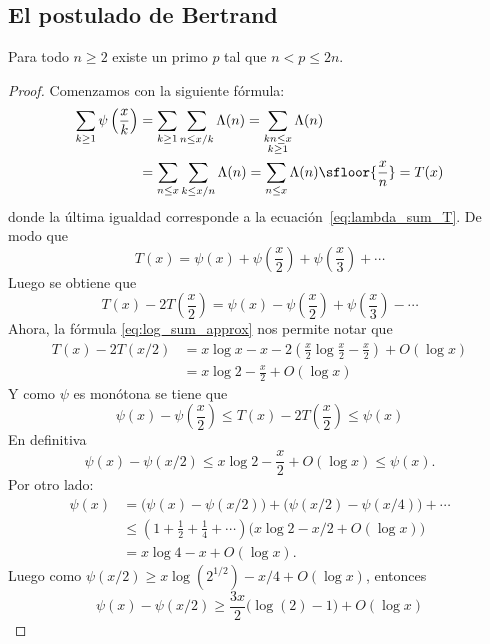 \documentclass[teoria-numeros.tex]{subfiles}
\begin{document}

\newpage
\subsection{El postulado de Bertrand}
\begin{thmi}
	Para todo $n \ge 2$ existe un primo $p$ tal que $n < p \le 2n$.
\end{thmi}
\begin{proof}
	Comenzamos con la siguiente fórmula:
	\begin{align*}
		\sum_{k\ge 1} \psi\left( \frac{x}{k} \right) &= \sum_{k\ge 1} \sum_{n \le x/k} \Lambda(n) = \sum_{\substack{ kn\le x \\ k\ge 1 }} \Lambda(n) \\
		&= \sum_{n\le x} \sum_{k\le x/n} \Lambda(n) = \sum_{n\le x} \Lambda(n) \sfloor{ \frac{x}{n} } = T(x)
	\end{align*}
	donde la última igualdad corresponde a la ecuación~\eqref{eq:lambda_sum_T}.
	De modo que
	$$ T(x) = \psi(x) + \psi\left( \frac{x}{2} \right) + \psi\left( \frac{x}{3} \right) + \cdots $$
	Luego se obtiene que
	$$ T(x) - 2T\left( \frac{x}{2} \right) = \psi(x) - \psi\left( \frac{x}{2} \right) + \psi\left( \frac{x}{3} \right) - \cdots $$
	Ahora, la fórmula \eqref{eq:log_sum_approx} nos permite notar que
	\begin{align*}
		T(x) - 2T(x/2) &= x\log x - x - 2\left( \frac{x}{2}\log \frac{x}{2} - \frac{x}{2} \right) + O(\log x) \\
		&= x\log 2 - \frac{x}{2} + O(\log x)
	\end{align*}
	Y como $\psi$ es monótona se tiene que
	$$ \psi(x) - \psi\left( \frac{x}{2} \right) \le T(x) - 2T\left( \frac{x}{2} \right) \le \psi(x) $$
	En definitiva
	$$ \psi(x) - \psi(x/2) \le x\log 2 - \frac{x}{2} + O(\log x) \le \psi(x). $$
	Por otro lado:
	\begin{align*}
		\psi(x) &= \big( \psi(x) - \psi(x/2) \big) + \big( \psi(x/2) - \psi(x/4) \big) + \cdots \\
		&\le \left( 1 + \frac{1}{2} + \frac{1}{4} + \cdots \right) \big( x\log 2 - x/2 + O(\log x) \big) \\
		&= x\log 4 - x + O(\log x).
	\end{align*}
	Luego como $\psi(x/2) \ge x\log(2^{1/2}) - x/4 + O(\log x)$, entonces
	$$ \psi(x) - \psi(x/2) \ge \frac{3x}{2}\big( \log(2) - 1 \big) + O(\log x) $$
\end{proof}
\end{document}
